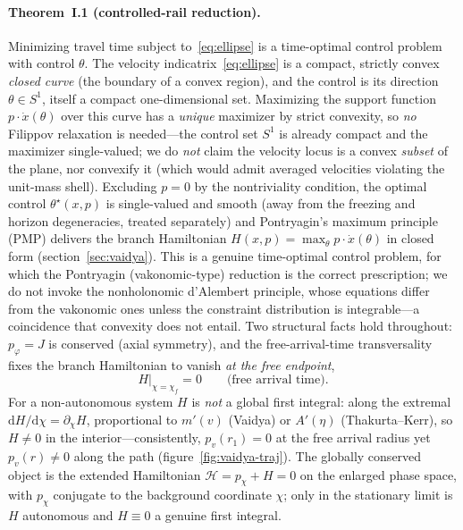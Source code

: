 \documentclass[12pt]{iopart}
\newcommand{\dd}{\mathrm{d}}
\begin{document}
\paragraph{Theorem~I.1 (controlled-rail reduction).} Minimizing travel time subject
to~\eqref{eq:ellipse} is a time-optimal control problem with control $\theta$.
The velocity indicatrix~\eqref{eq:ellipse} is a compact, strictly convex
\emph{closed curve} (the boundary of a convex region), and the control is its
direction $\theta\in S^1$, itself a compact one-dimensional set. Maximizing the
support function $p\cdot\dot x(\theta)$ over this curve has a \emph{unique} maximizer
by strict convexity, so \emph{no} Filippov relaxation is needed---the control set
$S^1$ is already compact and the maximizer single-valued; we do \emph{not} claim the
velocity locus is a convex \emph{subset} of the plane, nor convexify it (which would
admit averaged velocities violating the unit-mass shell). Excluding $p=0$ by the
nontriviality condition, the optimal control $\theta^\star(x,p)$ is single-valued and
smooth (away from the freezing and horizon degeneracies, treated separately) and
Pontryagin's maximum principle (PMP) \cite{Pontryagin,Liberzon} delivers the branch Hamiltonian
$H(x,p)=\max_\theta p\cdot\dot x(\theta)$ in closed form
(section~\ref{sec:vaidya}). This is a genuine time-optimal
control problem, for which the Pontryagin (vakonomic-type) reduction is the correct
prescription; we do not invoke the nonholonomic d'Alembert principle, whose
equations differ from the vakonomic ones unless the constraint distribution is
integrable---a coincidence that convexity does not entail. Two structural facts hold throughout: $p_\varphi=J$ is conserved (axial symmetry),
and the free-arrival-time transversality fixes the branch Hamiltonian to vanish
\emph{at the free endpoint},
\begin{equation}
    H\big|_{\chi=\chi_f}=0 \qquad\text{(free arrival time).}
    \label{eq:transversality}
\end{equation}
For a non-autonomous system $H$ is \emph{not} a global first integral: along the
extremal $\dd H/\dd\chi=\partial_\chi H$, proportional to $m'(v)$ (Vaidya) or $A'(\eta)$
(Thakurta--Kerr), so $H\neq0$ in the interior---consistently, $p_v(r_1)=0$ at the
free arrival radius yet $p_v(r)\neq0$ along the path (figure~\ref{fig:vaidya-traj}).
The globally conserved object is the extended Hamiltonian $\mathcal H=p_\chi+H=0$ on
the enlarged phase space, with $p_\chi$ conjugate to the background coordinate $\chi$; only
in the stationary limit is $H$ autonomous and $H\equiv0$ a genuine first integral.
\end{document}
